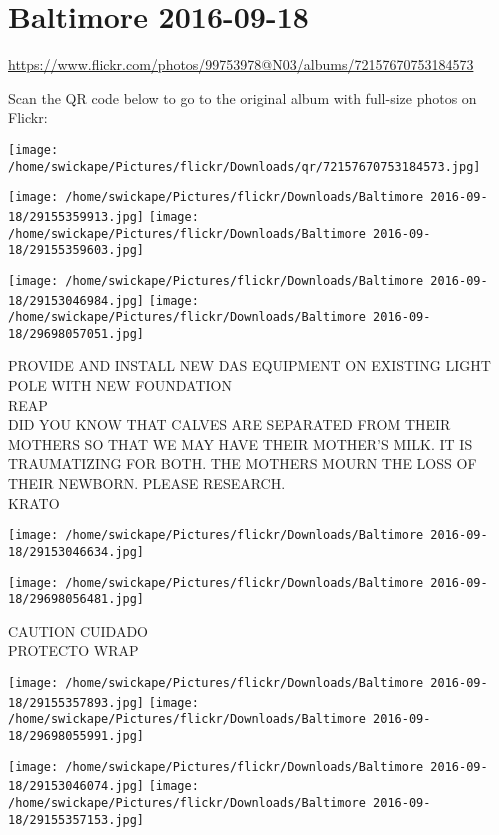\documentclass[10pt,letterpaper]{article}
\title{}
\author{}
\date{}
\begin{document}
\section*{Baltimore 2016-09-18}

\url{https://www.flickr.com/photos/99753978@N03/albums/72157670753184573}

Scan the QR code below to go to the original album with full-size photos on Flickr:

\texttt{[image: /home/swickape/Pictures/flickr/Downloads/qr/72157670753184573.jpg]}
\pagebreak

\texttt{[image: /home/swickape/Pictures/flickr/Downloads/Baltimore 2016-09-18/29155359913.jpg]}
\texttt{[image: /home/swickape/Pictures/flickr/Downloads/Baltimore 2016-09-18/29155359603.jpg]}

\texttt{[image: /home/swickape/Pictures/flickr/Downloads/Baltimore 2016-09-18/29153046984.jpg]}
\texttt{[image: /home/swickape/Pictures/flickr/Downloads/Baltimore 2016-09-18/29698057051.jpg]}

PROVIDE AND INSTALL NEW DAS EQUIPMENT ON EXISTING LIGHT POLE WITH NEW FOUNDATION\\
REAP\\
DID YOU KNOW THAT CALVES ARE SEPARATED FROM THEIR MOTHERS SO THAT WE MAY HAVE THEIR MOTHER'S MILK.  IT IS TRAUMATIZING FOR BOTH.  THE MOTHERS MOURN THE LOSS OF THEIR NEWBORN.  PLEASE RESEARCH.\\
KRATO
\pagebreak

\texttt{[image: /home/swickape/Pictures/flickr/Downloads/Baltimore 2016-09-18/29153046634.jpg]}

\vspace{0.25in}
\texttt{[image: /home/swickape/Pictures/flickr/Downloads/Baltimore 2016-09-18/29698056481.jpg]}

CAUTION CUIDADO\\
PROTECTO WRAP
\pagebreak

\texttt{[image: /home/swickape/Pictures/flickr/Downloads/Baltimore 2016-09-18/29155357893.jpg]}
\texttt{[image: /home/swickape/Pictures/flickr/Downloads/Baltimore 2016-09-18/29698055991.jpg]}

\texttt{[image: /home/swickape/Pictures/flickr/Downloads/Baltimore 2016-09-18/29153046074.jpg]}
\texttt{[image: /home/swickape/Pictures/flickr/Downloads/Baltimore 2016-09-18/29155357153.jpg]}
\end{document}
